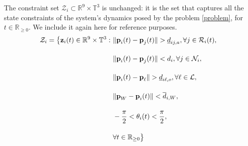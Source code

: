 The constraint set $\mathcal{Z}_i \subset \mathbb{R}^{9} \times \mathbb{T}^3$
is unchanged: it is the set that captures all the state constraints of
the system's dynamics posed by the problem \eqref{problem},
for $t \in \mathbb{R}_{\geq 0}$. We include it again here for reference
purposes.
\begin{align}
  \mathcal{Z}_i = \big\{\bm{\mathbf{z}}_i(t) \in \mathbb{R}^{9}\times \mathbb{T}^3 : \
      & \|\bm{\mathbf{p}}_i(t) - \bm{\mathbf{p}}_j(t)\| > \underline{d}_{ij,a}, \forall j \in \mathcal{R}_i(t), \label{constraint:p_1_2}\\[2.5ex]
      & \|\bm{\mathbf{p}}_i(t) - \bm{\mathbf{p}}_j(t)\| < d_i, \forall j \in \mathcal{N}_i, \\[2.5ex]
      & \|\bm{\mathbf{p}}_i(t) - \bm{\mathbf{p}}_{\ell}\| > \underline{d}_{i\ell,o}, \forall \ell \in \mathcal{L}, \\[2.5ex]
      & \|\bm{\mathbf{p}}_W - \bm{\mathbf{p}}_i(t)\| < \overline{d}_{i,W}, \\[2.5ex]
      & - \frac{\pi}{2} < \theta_i(t) < \frac{\pi}{2} \label{constraint:p_5_2}, \\[2.5ex]
      &\forall t \in \mathbb{R}_{\geq 0}\big\}
\end{align}
